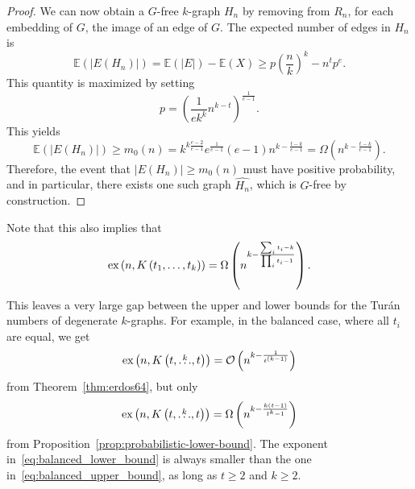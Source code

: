 \begin{proposition}
\begin{proof}
        We can now obtain a $G$-free $k$-graph $H_n$ by removing from $R_n$, for each embedding of $G$,
        the image of an edge of $G$.
        The expected number of edges in $H_n$ is
        \[
            \mathbb{E}(|E(H_n)|) = \mathbb{E}(|E|) - \mathbb{E}(X) \geq
            p \left( \frac{n}{k} \right)^k - n^t p^{e}.
        \]
        This quantity is maximized by setting
        \[
            p = \left( \frac{1}{ek^k} n^{k-t} \right)^{\frac{1}{e-1}}.
        \]
        This yields
        \[
            \mathbb{E}(|E(H_n)|) \geq
            m_0(n) =
            k^{k \frac{e-2}{e-1}} e^{\frac{1}{e-1}}(e-1) n^{k - \frac{t-k}{e-1}}
            = \Omega\left(n^{k - \frac{t-k}{e-1}} \right).
        \]
        Therefore, the event that $|E(H_n)| \geq m_0(n)$
        must have positive probability, and in particular,
        there exists one such graph $\widehat{H_n}$, which is $G$-free by construction.

    \end{proof}

\end{proposition}

Note that this also implies that
\[
    \text{ex} \left( n, K\left(t_1, \dots, t_k\right) \right) = \Omega\left(n^{k - \frac{\sum_i t_i - k}{\prod_i t_i - 1}}\right).
\]
This leaves a very large gap between the upper and lower bounds for the Turán numbers of degenerate $k$-graphs.
For example, in the balanced case, where all $t_i$ are equal, we get
\begin{equation} \label{eq:balanced_upper_bound}
    \text{ex} \left( n, K\left(t, \overset{k}{\dots}, t\right) \right) = \mathcal{O}\left(n^{k - \frac{1}{t^{(k-1)}}}\right)
\end{equation}
from Theorem~\ref{thm:erdos64}, but only
\begin{equation} \label{eq:balanced_lower_bound}
    \text{ex} \left( n, K\left(t, \overset{k}{\dots}, t\right) \right) = \Omega\left(n^{k - \frac{k(t-1)}{t^k - 1}}\right)
\end{equation}
from Proposition~\ref{prop:probabilistic-lower-bound}.
The exponent in~\eqref{eq:balanced_lower_bound} is always
smaller than the one in~\eqref{eq:balanced_upper_bound},
as long as $t \geq 2$ and $k \geq 2$.

